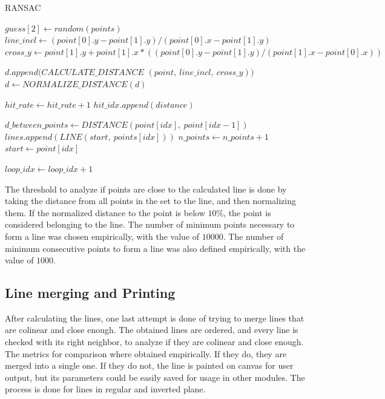 \documentclass[twoside,conference,a4paper]{IEEEtran}
\begin{document}
\begin{algorithm}
    \caption{RANSAC}\label{code:ransac}
    \begin{algorithmic}[1]
        \State $guess[2] \gets random(points)$
        \State $line\_incl \gets (point[0].y - point[1].y)/(point[0].x - point[1].y)$
        \State $cross\_y \gets point[1].y + point[1].x*((point[0].y - point[1].y)/(point[1].x - point[0].x))$

            \State $d.append(CALCULATE\_DISTANCE$
            $(point,\ line\_incl,\ cross\_y))$
        \EndFor
        \State $d \gets NORMALIZE\_DISTANCE(d)$

                \State $hit\_rate \gets hit\_rate + 1$
                \State $hit\_idx.append(distance)$
            \EndIf
        \EndFor

                \State $d\_between\_points \gets DISTANCE(point[idx],\ point[idx - 1])$
                        \State $lines.append(LINE(start,\ points[idx]))$
                    \EndIf
                \Else
                    \State $n\_points \gets n\_points + 1$
                \EndIf
                \State $start \gets point[idx]$
            \EndFor
        \EndIf

        \State $loop\_idx \gets loop\_idx + 1$
        \EndWhile
        \EndProcedure
    \end{algorithmic}
\end{algorithm}
The threshold to analyze if points are close to the calculated line is done by taking the distance from all points in the set to the line, and then normalizing them. If the normalized distance to the point is below $10\%$, the point is considered belonging to the line. The number of minimum points necessary to form a line was chosen empirically, with the value of $10000$. The number of minimum consecutive points to form a line was also defined empirically, with the value of $1000$.

\subsection{Line merging and Printing}
After calculating the lines, one last attempt is done of trying to merge lines that are colinear and close enough. The obtained lines are ordered, and every line is checked with its right neighbor, to analyze if they are colinear and close enough. The metrics for comparison where obtained empirically. If they do, they are merged into a single one. If they do not, the line is painted on canvas for user output, but its parameters could be easily saved for usage in other modules. The process is done for lines in regular and inverted plane. 
\end{document}
